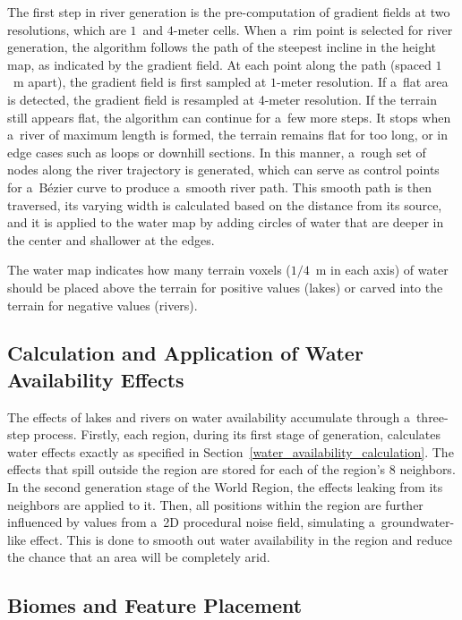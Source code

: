 The first step in river generation is the pre-computation of gradient fields at two resolutions, which are $1$~and $4$-meter cells. When a~rim point is selected for river generation, the algorithm follows the path of the steepest incline in the height map, as indicated by the gradient field. At each point along the path (spaced $1$~m apart), the gradient field is first sampled at $ 1$-meter resolution. If a~flat area is detected, the gradient field is resampled at 4-meter resolution. If the terrain still appears flat, the algorithm can continue for a~few more steps. It stops when a~river of maximum length is formed, the terrain remains flat for too long, or in edge cases such as loops or downhill sections. In this manner, a~rough set of nodes along the river trajectory is generated, which can serve as control points for a~Bézier curve to produce a~smooth river path. This smooth path is then traversed, its varying width is calculated based on the distance from its source, and it is applied to the water map by adding circles of water that are deeper in the center and shallower at the edges.

The water map indicates how many terrain voxels ($1/4$~m in each axis) of water should be placed above the terrain for positive values (lakes) or carved into the terrain for negative values (rivers).


\subsection{Calculation and Application of Water Availability Effects}

The effects of lakes and rivers on water availability accumulate through a~three-step process. Firstly, each region, during its first stage of generation, calculates water effects exactly as specified in Section~\ref{water_availability_calculation}. The effects that spill outside the region are stored for each of the region's 8 neighbors. In the second generation stage of the World Region, the effects leaking from its neighbors are applied to it. Then, all positions within the region are further influenced by values from a~2D procedural noise field, simulating a~groundwater-like effect. This is done to smooth out water availability in the region and reduce the chance that an area will be completely arid.

\subsection{Biomes and Feature Placement}

